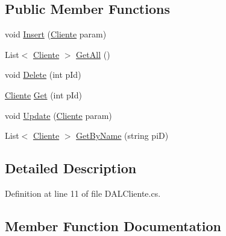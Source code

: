 \subsection*{Public Member Functions}
\begin{DoxyCompactItemize}
\item 
void \hyperlink{classprj_progra_i_i_i_1_1_layer_1_1_d_a_l_1_1_d_a_l_cliente_ab9646dc3260db65cb7baf86ed33e3d70}{Insert} (\hyperlink{classprj_progra_i_i_i_1_1_layer_1_1_entities_1_1_cliente}{Cliente} param)
\item 
List$<$ \hyperlink{classprj_progra_i_i_i_1_1_layer_1_1_entities_1_1_cliente}{Cliente} $>$ \hyperlink{classprj_progra_i_i_i_1_1_layer_1_1_d_a_l_1_1_d_a_l_cliente_a7c513194970afd18572e1b93bb8ba4d9}{Get\+All} ()
\item 
void \hyperlink{classprj_progra_i_i_i_1_1_layer_1_1_d_a_l_1_1_d_a_l_cliente_aa864635af5a546442d825e34483cf736}{Delete} (int p\+Id)
\item 
\hyperlink{classprj_progra_i_i_i_1_1_layer_1_1_entities_1_1_cliente}{Cliente} \hyperlink{classprj_progra_i_i_i_1_1_layer_1_1_d_a_l_1_1_d_a_l_cliente_a4012b382e3da25b5300a46f05a81efb3}{Get} (int p\+Id)
\item 
void \hyperlink{classprj_progra_i_i_i_1_1_layer_1_1_d_a_l_1_1_d_a_l_cliente_abced90e9e9a3314ee0af02dc6871f9ce}{Update} (\hyperlink{classprj_progra_i_i_i_1_1_layer_1_1_entities_1_1_cliente}{Cliente} param)
\item 
List$<$ \hyperlink{classprj_progra_i_i_i_1_1_layer_1_1_entities_1_1_cliente}{Cliente} $>$ \hyperlink{classprj_progra_i_i_i_1_1_layer_1_1_d_a_l_1_1_d_a_l_cliente_ad65a26a4c49f914716a21169e79815c8}{Get\+By\+Name} (string piD)
\end{DoxyCompactItemize}


\subsection{Detailed Description}


Definition at line 11 of file D\+A\+L\+Cliente.\+cs.



\subsection{Member Function Documentation}
\hypertarget{classprj_progra_i_i_i_1_1_layer_1_1_d_a_l_1_1_d_a_l_cliente_aa864635af5a546442d825e34483cf736}{}\label{classprj_progra_i_i_i_1_1_layer_1_1_d_a_l_1_1_d_a_l_cliente_aa864635af5a546442d825e34483cf736} 
